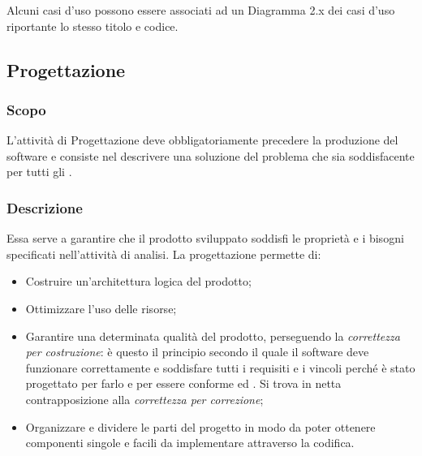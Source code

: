 \documentclass[../NomeDocumento.tex]{subfiles}
\begin{document}
	Alcuni casi d'uso possono essere associati ad un Diagramma  2.x dei casi d'uso riportante lo stesso titolo e codice.
	
\subsection{Progettazione} 

	\subsubsection{Scopo} 

	L'attività di Progettazione deve obbligatoriamente precedere la produzione del software e consiste nel descrivere una soluzione del problema che sia soddisfacente per tutti gli .
	
	\subsubsection{Descrizione}
	
	Essa serve a garantire che il prodotto sviluppato soddisfi le proprietà e i bisogni specificati nell'attività di analisi. La progettazione permette di:
	
	\begin{itemize}
		\item Costruire un’architettura logica del prodotto;
		\item Ottimizzare l’uso delle risorse;
		\item Garantire una determinata qualità del prodotto, perseguendo la \textit{correttezza per costruzione}: è questo il principio secondo il quale il software deve funzionare correttamente e soddisfare tutti i requisiti e i vincoli perché è stato progettato per farlo e per essere conforme ed . Si trova in netta contrapposizione alla \textit{correttezza per
		correzione};
		\item Organizzare e dividere le parti del progetto in modo da poter ottenere componenti singole e facili da implementare attraverso la codifica. 
	\end{itemize}
\end{document}
